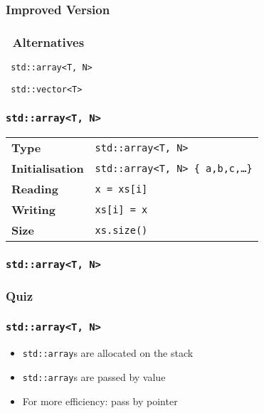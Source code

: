 \documentclass[handout]{ucll-slides}
\begin{document}
\begin{frame}
  \frametitle{Improved Version}
\end{frame}

\begin{frame}
  \frametitle{\cpp\ Alternatives}
  \begin{center} \tt
    std::array<T, N>
  \end{center}
  \vskip5mm
  \begin{center} \tt
    std::vector<T>
  \end{center}
\end{frame}

\begin{frame}
  \frametitle{\tt std::array<T, N>}
  \begin{center}
    \begin{tabular}{ll}
      \bf Type & {\tt std::array<T, N>} \\[2mm]
      \bf Initialisation & {\tt std::array<T, N> \{ a,b,c,\dots \}} \\[2mm]
      \bf Reading & {\tt x = xs[i]} \\[2mm]
      \bf Writing & {\tt xs[i] = x} \\[2mm]
      \bf Size & {\tt xs.size()} \\
    \end{tabular}
  \end{center}
\end{frame}

\begin{frame}
  \frametitle{\tt std::array<T, N>}
\end{frame}

\begin{frame}
  \frametitle{Quiz}
\end{frame}

\begin{frame}
  \frametitle{\tt std::array<T, N>}
  \begin{itemize}
    \item {\tt std::array}s are allocated on the stack
    \item {\tt std::array}s are passed by value
    \item For more efficiency: pass by pointer
  \end{itemize}
\end{frame}
\end{document}
